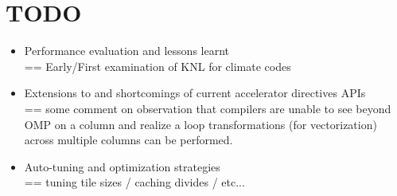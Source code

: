 \documentclass{sig-alternate-05-2015}
\begin{document}
%
%
%
%
%
\newpage
\section*{TODO}

\begin{itemize}
\item Performance evaluation and lessons learnt \\
  == Early/First examination of KNL for climate codes
\item Extensions to and shortcomings of current accelerator directives APIs \\
  == some comment on observation that compilers are unable to see beyond OMP on
a column and realize a loop transformations (for vectorization) across multiple
columns can be performed.
\item Auto-tuning and optimization strategies \\
  == tuning tile sizes / caching divides / etc...
\end{itemize}
\end{document}
